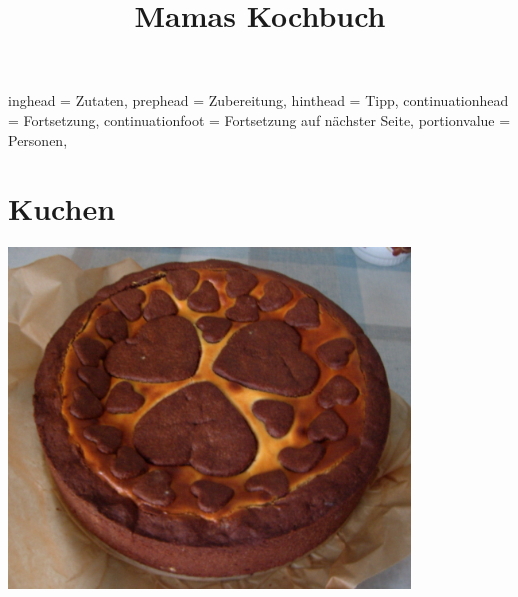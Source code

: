 \documentclass[%
a4paper,
11pt
]{article}
\begin{document}
\title{Mamas Kochbuch}

\maketitle

\setHeadlines
{%
    inghead = Zutaten,
    prephead = Zubereitung,
    hinthead = Tipp,
    continuationhead = Fortsetzung,
    continuationfoot = Fortsetzung auf n\"achster Seite,
    portionvalue = Personen,
}


\tableofcontents

\vspace{5em}
\newpage
\section{Kuchen}

\begin{center}
\includegraphics[width=0.8\textwidth]{./Bilder/RussischerZupfkuchen}
\end{center}



\end{document}
